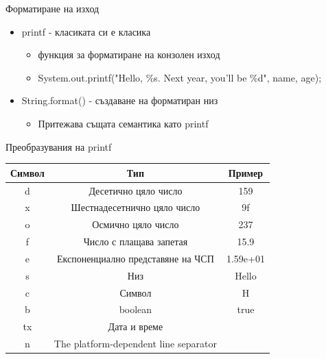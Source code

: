 \documentclass{beamer}
\begin{document}
\begin{frame}{Форматиране на изход}
  \transdissolve
  \begin{itemize}
  \item printf - класиката си е класика
    \begin{itemize}
      \item функция за форматиране на конзолен изход
      \item System.out.printf("Hello, \%s. Next year, you'll be \%d", name, age);
    \end{itemize}
  \item String.format() - създаване на форматиран низ
    \begin{itemize}
      \item Притежава същата семантика като printf
    \end{itemize}

  \end{itemize}
\end{frame}

\begin{frame}{Преобразувания на printf}
  \transdissolve
  \begin{tabular}{|c|c|c|}
    \hline
    Символ  & Тип                &          Пример \\
    \hline
    d & Десетично цяло число &                         159 \\
    \hline
    x & Шестнадесетнично цяло число &                 9f \\
    \hline
    o & Осмично цяло число  &                      237 \\
    \hline
    f & Число с плащава запетая &             15.9 \\
    \hline
    e & Експоненциално представяне на ЧСП &           1.59e+01 \\
    \hline
    s & Низ &                                                Hello \\
    \hline
    c & Символ &                                                 H \\
    \hline
    b &  boolean                 &                        true \\
    \hline
    tx & Дата и време &  \\
    \hline
    n & The platform-dependent line separator & \\
    \hline
  \end{tabular}

\end{frame}
\end{document}
